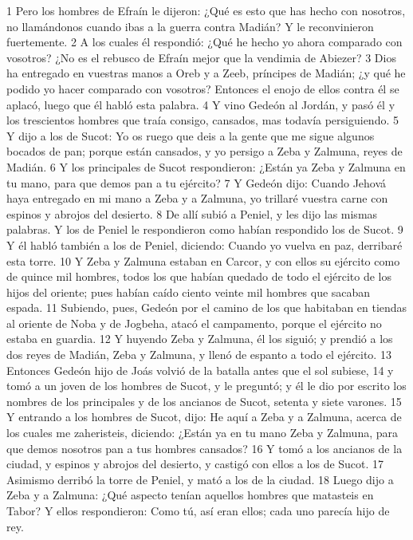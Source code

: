 1 Pero los hombres de Efraín le dijeron: ¿Qué es esto que has hecho con nosotros, no llamándonos cuando ibas a la guerra contra Madián? Y le reconvinieron fuertemente.
2 A los cuales él respondió: ¿Qué he hecho yo ahora comparado con vosotros? ¿No es el rebusco de Efraín mejor que la vendimia de Abiezer?
3 Dios ha entregado en vuestras manos a Oreb y a Zeeb, príncipes de Madián; ¿y qué he podido yo hacer comparado con vosotros? Entonces el enojo de ellos contra él se aplacó, luego que él habló esta palabra.
4 Y vino Gedeón al Jordán, y pasó él y los trescientos hombres que traía consigo, cansados, mas todavía persiguiendo.
5 Y dijo a los de Sucot: Yo os ruego que deis a la gente que me sigue algunos bocados de pan; porque están cansados, y yo persigo a Zeba y Zalmuna, reyes de Madián.
6 Y los principales de Sucot respondieron: ¿Están ya Zeba y Zalmuna en tu mano, para que demos pan a tu ejército?
7 Y Gedeón dijo: Cuando Jehová haya entregado en mi mano a Zeba y a Zalmuna, yo trillaré vuestra carne con espinos y abrojos del desierto.
8 De allí subió a Peniel, y les dijo las mismas palabras. Y los de Peniel le respondieron como habían respondido los de Sucot.
9 Y él habló también a los de Peniel, diciendo: Cuando yo vuelva en paz, derribaré esta torre.
10 Y Zeba y Zalmuna estaban en Carcor, y con ellos su ejército como de quince mil hombres, todos los que habían quedado de todo el ejército de los hijos del oriente; pues habían caído ciento veinte mil hombres que sacaban espada.
11 Subiendo, pues, Gedeón por el camino de los que habitaban en tiendas al oriente de Noba y de Jogbeha, atacó el campamento, porque el ejército no estaba en guardia.
12 Y huyendo Zeba y Zalmuna, él los siguió; y prendió a los dos reyes de Madián, Zeba y Zalmuna, y llenó de espanto a todo el ejército.
13 Entonces Gedeón hijo de Joás volvió de la batalla antes que el sol subiese,
14 y tomó a un joven de los hombres de Sucot, y le preguntó; y él le dio por escrito los nombres de los principales y de los ancianos de Sucot, setenta y siete varones.
15 Y entrando a los hombres de Sucot, dijo: He aquí a Zeba y a Zalmuna, acerca de los cuales me zaheristeis, diciendo: ¿Están ya en tu mano Zeba y Zalmuna, para que demos nosotros pan a tus hombres cansados?
16 Y tomó a los ancianos de la ciudad, y espinos y abrojos del desierto, y castigó con ellos a los de Sucot.
17 Asimismo derribó la torre de Peniel, y mató a los de la ciudad.
18 Luego dijo a Zeba y a Zalmuna: ¿Qué aspecto tenían aquellos hombres que matasteis en Tabor? Y ellos respondieron: Como tú, así eran ellos; cada uno parecía hijo de rey.
